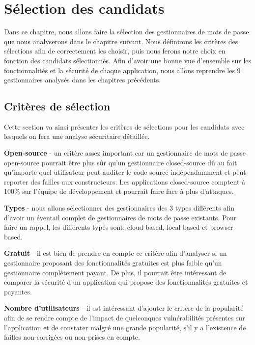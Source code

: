 
\chapter{Sélection des candidats}
\label{ch:selection}
Dans ce chapitre, nous allons faire la sélection des gestionnaires de mots de passe que nous analyserons dans le
chapitre suivant. Nous définirons les critères des sélections afin de correctement les choisir, puis nous ferons
notre choix en fonction des candidats sélectionnés. Afin d'avoir une bonne vue d'ensemble sur les fonctionnalités et
la sécurité de chaque application, nous allons reprendre les 9 gestionnaires analysés dans les chapitres précédents.

\section{Critères de sélection}

Cette section va ainsi présenter les critères de sélections pour les candidats avec lesquels on fera une analyse
sécuritaire détaillée.

\textbf{Open-source} - un critère assez important car un gestionnaire de mots de passe open-source pourrait être plus
sûr qu'un gestionnaire closed-source dû au fait qu'importe quel utilisateur peut auditer le code source
indépendamment et peut reporter des failles aux constructeurs. Les applications closed-source comptent à 100\% sur
l'équipe de développement et pourrait faire face à plus d'attaques.

\textbf{Types} - nous allons sélectionner des gestionnaires des 3 types différents afin d'avoir un éventail complet
de gestionnaires de mots de passe existants. Pour faire un rappel, les différents types sont: cloud-based,
local-based et browser-based.

\textbf{Gratuit} - il est bien de prendre en compte ce critère afin d'analyser si un gestionnaire proposant des
fonctionnalités gratuites est plus faible qu'un gestionnaire complètement payant. De plus, il pourrait être
intéressant de comparer la sécurité d'un application qui propose des fonctionnalités gratuites et payantes.

\textbf{Nombre d'utilisateurs} - il est intéressant d'ajouter le critère de la popularité afin de se rendre compte
de l'impact de quelconques vulnérabilités présentes sur l'application et de constater malgré une grande
popularité, s'il y a l'existence de failles non-corrigées ou non-prises en compte.

